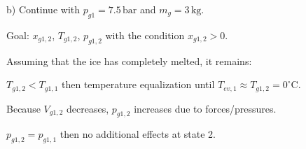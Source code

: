 b) Continue with \( p_{g1} = 7.5 \, \text{bar} \) and \( m_g = 3 \, \text{kg} \).

Goal: \( x_{g1,2} \), \( T_{g1,2} \), \( p_{g1,2} \) with the condition \( x_{g1,2} > 0 \).

Assuming that the ice has completely melted, it remains:

\( T_{g1,2} < T_{g1,1} \) then temperature equalization until \( T_{ev,1} \approx T_{g1,2} = 0^\circ \text{C} \).

Because \( V_{g1,2} \) decreases, \( p_{g1,2} \) increases due to forces/pressures.

\( p_{g1,2} = p_{g1,1} \) then no additional effects at state 2.